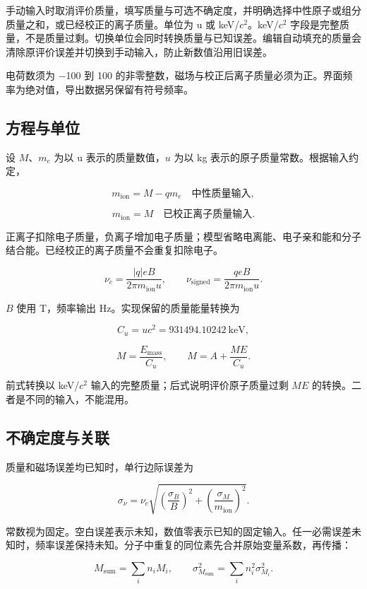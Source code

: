 \documentclass[
  aps,
  onecolumn,
  11pt]{revtex4-2}
\begin{document}
手动输入时取消评价质量，填写质量与可选不确定度，并明确选择中性原子或组分质量之和，或已经校正的离子质量。单位为
u 或 keV/\(c^2\)。keV/\(c^2\)
字段是完整质量，不是质量过剩。切换单位会同时转换质量与已知误差。编辑自动填充的质量会清除原评价误差并切换到手动输入，防止新数值沿用旧误差。

电荷数须为 −100 到 100
的非零整数，磁场与校正后离子质量必须为正。界面频率为绝对值，导出数据另保留有符号频率。

\subsection{方程与单位}\label{ux65b9ux7a0bux4e0eux5355ux4f4d}

设 \(M\)、\(m_e\) 为以 u 表示的质量数值，\(u\) 为以 kg
表示的原子质量常数。根据输入约定，

\[m_{\mathrm{ion}}=M-qm_e\quad\text{中性质量输入},\]

\[m_{\mathrm{ion}}=M\quad\text{已校正离子质量输入}.\]

正离子扣除电子质量，负离子增加电子质量；模型省略电离能、电子亲和能和分子结合能。已经校正的离子质量不会重复扣除电子。

\[\nu_c=\frac{|q|eB}{2\pi m_{\mathrm{ion}}u},\qquad \nu_{\mathrm{signed}}=\frac{qeB}{2\pi m_{\mathrm{ion}}u}.\]

\(B\) 使用 T，频率输出 Hz。实现保留的质量能量转换为

\[C_u=uc^2=931494.10242\ {\mathrm{keV}},\]

\[M=\frac{E_{\mathrm{mass}}}{C_u},\qquad M=A+\frac{ME}{C_u}.\]

前式转换以 keV/\(c^2\) 输入的完整质量；后式说明评价原子质量过剩 \(ME\)
的转换。二者是不同的输入，不能混用。

\subsection{不确定度与关联}\label{ux4e0dux786eux5b9aux5ea6ux4e0eux5173ux8054}

质量和磁场误差均已知时，单行边际误差为

\[\sigma_{\nu}=\nu_c\sqrt{\left(\frac{\sigma_B}{B}\right)^2+\left(\frac{\sigma_M}{m_{\mathrm{ion}}}\right)^2}.\]

常数视为固定。空白误差表示未知，数值零表示已知的固定输入。任一必需误差未知时，频率误差保持未知。分子中重复的同位素先合并原始变量系数，再传播：

\[M_{\mathrm{sum}}=\sum_i n_iM_i,\qquad \sigma_{M_{\mathrm{sum}}}^2=\sum_i n_i^2\sigma_{M_i}^2.\]
\end{document}
